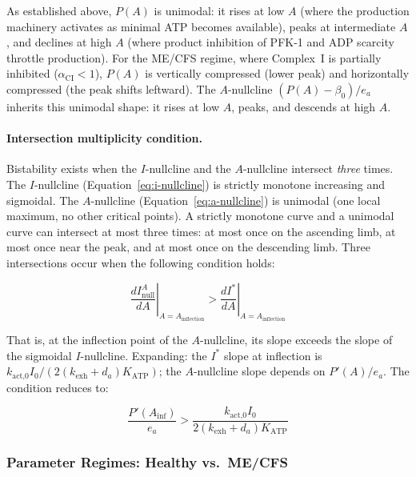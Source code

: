 As established above, $P(A)$ is unimodal: it rises at low $A$ (where the production machinery activates as minimal ATP becomes available), peaks at intermediate $A$, and declines at high $A$ (where product inhibition of PFK-1 and ADP scarcity throttle production). For the ME/CFS regime, where Complex~I is partially inhibited ($\alpha_{\text{CI}} < 1$), $P(A)$ is vertically compressed (lower peak) and horizontally compressed (the peak shifts leftward). The $A$-nullcline $(P(A) - \beta_0)/e_a$ inherits this unimodal shape: it rises at low $A$, peaks, and descends at high $A$.

\paragraph{Intersection multiplicity condition.}
Bistability exists when the $I$-nullcline and the $A$-nullcline intersect \emph{three} times. The $I$-nullcline (Equation~\ref{eq:i-nullcline}) is strictly monotone increasing and sigmoidal. The $A$-nullcline (Equation~\ref{eq:a-nullcline}) is unimodal (one local maximum, no other critical points). A strictly monotone curve and a unimodal curve can intersect at most three times: at most once on the ascending limb, at most once near the peak, and at most once on the descending limb. Three intersections occur when the following condition holds:

\begin{equation}
\label{eq:bistability-condition}
\left.\frac{d I_{\text{null}}^A}{d A}\right|_{A=A_{\text{inflection}}} > \left.\frac{d I^*}{d A}\right|_{A=A_{\text{inflection}}}
\end{equation}

That is, at the inflection point of the $A$-nullcline, its slope exceeds the slope of the sigmoidal $I$-nullcline. Expanding: the $I^*$ slope at inflection is $k_{\text{act,0}} I_0 / (2 (k_{\text{exh}} + d_a) K_{\text{ATP}})$; the $A$-nullcline slope depends on $P'(A) / e_a$. The condition reduces to:

\begin{equation}
\label{eq:bistability-inequality}
\frac{P'(A_{\text{inf}})}{e_a} > \frac{k_{\text{act,0}} I_0}{2 (k_{\text{exh}} + d_a) K_{\text{ATP}}}
\end{equation}

\subsubsection{Parameter Regimes: Healthy vs.\ ME/CFS}
\label{sec:parameter-regimes}

